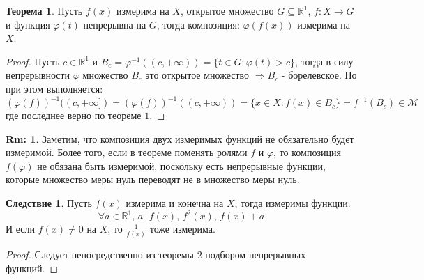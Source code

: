 \documentclass[12pt]{article}
\newcommand{\MR}{\mathbb{R}}
\newcommand{\MM}{\mathcal{M}}
\theoremstyle{definition}
\newtheorem{rem}{Rm:}
\newtheorem{theorem}{Теорема}
\newtheorem{corollary}{Следствие}
\begin{document}
\begin{theorem}
	Пусть $f(x)$ измерима на $X$, открытое множество $G \subseteq \MR^1$, $f \colon X \to G$ и функция $\varphi(t)$ непрерывна на $G$, тогда композиция: $\varphi(f(x))$ измерима на $X$.
\end{theorem}
\begin{proof}
	Пусть $c \in \MR^1$ и $B_c = \varphi^{-1}((c,+\infty)) = \{t \in G \colon \varphi(t) > c\}$, тогда в силу непрерывности $\varphi$ множество $B_c$ это открытое множество $\Rightarrow B_c$ - борелевское. Но при этом выполняется:
	$$
		(\varphi(f))^{-1}((c,+\infty]) = (\varphi(f))^{-1}((c,+\infty)) =\{x \in X \colon f(x) \in B_c\} = f^{-1}(B_c) \in \MM
	$$
	где последнее верно по теореме $1$.
\end{proof}
\begin{rem}
	Заметим, что композиция двух измеримых функций не обязательно будет измеримой. Более того, если в теореме поменять ролями $f$ и $\varphi$, то композиция $f(\varphi)$ не обязана быть измеримой, поскольку есть непрерывные функции, которые множество меры нуль переводят не в множество меры нуль.
\end{rem}
\begin{corollary}
	Пусть $f(x)$ измерима и конечна на $X$, тогда измеримы функции: 
	$$
		\forall a \in \MR^1, \, a{\cdot}f(x), \,  f^2(x), \, f(x) + a
	$$
	И если $f(x) \neq 0$ на $X$, то $\tfrac{1}{f(x)}$ тоже измерима.
\end{corollary}
\begin{proof}
	Следует непосредственно из теоремы $2$ подбором непрерывных функций.
\end{proof}
\end{document}
